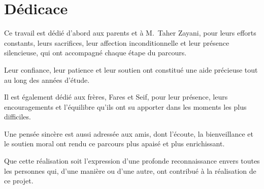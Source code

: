 \chapter*{D\'edicace}

\thispagestyle{empty}
\vspace*{2cm}
Ce travail est d\'edi\'e d'abord aux parents et \`a M.~Taher Zayani, pour leurs efforts constants, leurs sacrifices, leur affection inconditionnelle et leur pr\'esence silencieuse, qui ont accompagn\'e chaque \'etape du parcours.

\vspace{0.8cm}

Leur confiance, leur patience et leur soutien ont constitu\'e une aide pr\'ecieuse tout au long des ann\'ees d'\'etude.

\vspace{0.8cm}

Il est \'egalement d\'edi\'e aux fr\`eres, Fares et Seif, pour leur pr\'esence, leurs encouragements et l'\'equilibre qu'ils ont su apporter dans les moments les plus difficiles.

\vspace{0.8cm}

Une pens\'ee sinc\`ere est aussi adress\'ee aux amis, dont l'\'ecoute, la bienveillance et le soutien moral ont rendu ce parcours plus apais\'e et plus enrichissant.

\vspace{0.8cm}

Que cette r\'ealisation soit l'expression d'une profonde reconnaissance envers toutes les personnes qui, d'une mani\`ere ou d'une autre, ont contribu\'e \`a la r\'ealisation de ce projet.
